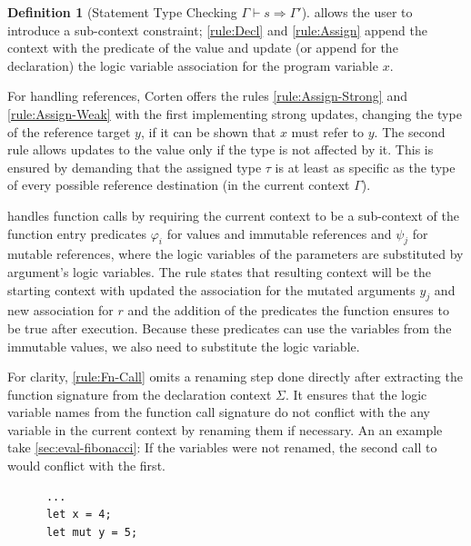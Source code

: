 \documentclass[twoside, english]{sdqthesis}
\theoremstyle{definition}
\newtheorem{definition}[theorem]{Definition}
\begin{document}
\begin{definition}[Statement Type Checking $\Gamma \vdash s \Rightarrow \Gamma'$]
 allows the user to introduce a sub-context constraint; \cref{rule:Decl} and \cref{rule:Assign} append the context with the predicate of the value and update (or append for the declaration) the logic variable association for the program variable $x$. 

For handling references, Corten offers the rules \cref{rule:Assign-Strong} and \cref{rule:Assign-Weak} with the first implementing 
strong updates, changing the type of the reference target $y$, if it can be shown that $x$ must refer to $y$. 
The second rule allows updates to the value only if the type is not affected by it. This is ensured by demanding that the assigned type $\tau$ is at least as specific as the type of every possible reference destination (in the current context $\Gamma$).


 handles function calls by requiring the current context to be a sub-context of the function entry predicates $\varphi_i$ for values and immutable references and $\psi_j$ for mutable references, where the logic variables of the parameters are substituted by argument's logic variables. 
The rule states that resulting context will be the starting context with updated the association for the mutated arguments $y_j$ and new association for $r$ and the addition of the predicates the function ensures to be true after execution. Because these predicates can use the variables from the immutable values, we also need to substitute the logic variable.

For clarity, \cref{rule:Fn-Call} omits a renaming step done directly after extracting the function signature from the declaration context $\Sigma$. It ensures that the logic variable names from the function call signature do not conflict with the any variable in the current context by renaming them if necessary. An an example take \cref{sec:eval-fibonacci}: If the variables were not renamed, the second call to  would conflict with the first.


\begin{listing}[h]
  \begin{minipage}[t]{0.48\linewidth}
    \begin{verbatim}
      ...
      let x = 4;
      let mut y = 5;
      

\end{verbatim}
\end{minipage}
\end{listing}
\end{definition}
\end{document}
